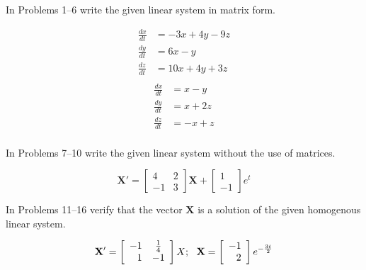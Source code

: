 \documentclass[chapter=8,section=1]{math252homework}
\begin{document}
In Problems 1--6 write the given linear system in matrix form.
\begin{problems}[start=3]
	\problem \begin{equation*}
	\begin{aligned}
		\frac{dx}{dt} &= -3x + 4y - 9z\\
		\frac{dy}{dt} &= 6x - y\\
		\frac{dz}{dt} &= 10x + 4y + 3z\\
	\end{aligned}
	\end{equation*}			%
	\problem \begin{equation*}
	\begin{aligned}
		\frac{dx}{dt} &= x - y\\
		\frac{dy}{dt} &= x + 2z\\
		\frac{dz}{dt} &= -x + z\\
	\end{aligned}
	\end{equation*}			%
\end{problems}

In Problems 7--10 write the given linear system without the use of matrices.
\begin{problems}[start=7]
	\problem \[ \mathbf{X}' = \left[ \begin{array}{rc}
		4 & 2\\
		-1 & 3
	\end{array} \right]\mathbf{X} + \left[ \begin{array}{r}
		1\\
		-1
	\end{array} \right] e^{t} \]			%
\end{problems}

In Problems 11--16 verify that the vector $\mathbf{X}$ is a solution of the given homogenous linear system.
\begin{problems}[start=13]
	\problem \[ \mathbf{X'} = \left[ \begin{array}{rc}
		-1 & \frac{1}{4}\\
		1 & -1\\
	\end{array} \right]X;\mbox{{ }{ }} \mathbf{X} = \left[ \begin{array}{r}
		-1\\
		2
	\end{array} \right]e^{-\frac{3t}{2}} \]			%
\end{problems}
\end{document}
